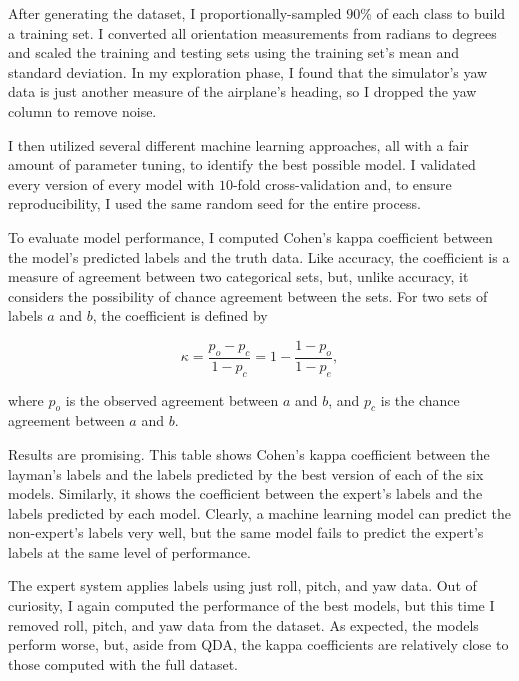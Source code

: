 \documentclass{article}
\begin{document}
After generating the dataset, I proportionally-sampled $90\%$ of each class to build a training set. I converted all orientation measurements from radians to degrees and scaled the training and testing sets using the training set's mean and standard deviation. In my exploration phase, I found that the simulator's yaw data is just another measure of the airplane's heading, so I dropped the yaw column to remove noise.


I then utilized several different machine learning approaches, all with a fair amount of parameter tuning, to identify the best possible model. I validated every version of every model with $10$-fold cross-validation and, to ensure reproducibility, I used the same random seed for the entire process.


To evaluate model performance, I computed Cohen's kappa coefficient between the model's predicted labels and the truth data. Like accuracy, the coefficient is a measure of agreement between two categorical sets, but, unlike accuracy, it considers the possibility of chance agreement between the sets. For two sets of labels $a$ and $b$, the coefficient is defined by

\[ \kappa = \frac{p_o - p_c}{1 - p_c} = 1 - \frac{1 - p_o}{1 - p_e}, \]

\noindent where $p_o$ is the observed agreement between $a$ and $b$, and $p_c$ is the chance agreement between $a$ and $b$.

Results are promising. This table shows Cohen's kappa coefficient between the layman's labels and the labels predicted by the best version of each of the six models. Similarly, it shows the coefficient between the expert's labels and the labels predicted by each model. Clearly, a machine learning model can predict the non-expert's labels very well, but the same model fails to predict the expert's labels at the same level of performance.

The expert system applies labels using just roll, pitch, and yaw data. Out of curiosity, I again computed the performance of the best models, but this time I removed roll, pitch, and yaw data from the dataset. As expected, the models perform worse, but, aside from QDA, the kappa coefficients are relatively close to those computed with the full dataset.
\end{document}

